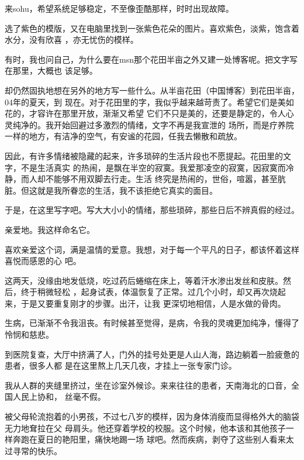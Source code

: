 \documentclass[12pt,a4paper]{article}
\begin{document}
	\endwriting



		来sohu，希望系统足够稳定，不至像歪酷那样，时时出现故障。

		选了紫色的模版，又在电脑里找到一张紫色花朵的图片。喜欢紫色，淡紫，饱含着水分，没有欣喜
	，亦无忧伤的模样。

		有时，我也问自己，为什么要在msn那个花田半亩之外又建一处博客呢。把文字写在那里，大概也
	该足够。

		却仍然固执地想在另外的地方写一些什么。从半亩花田（中国博客）到花田半亩，04年的夏天，到
	现在。对于花田里的字，我似乎越来越苛责了。希望它们是美如花的，才容许在那里开放，渐渐又希望
	它们不只是美的，还要是静定的，令人心灵纯净的。我开始回避过多激烈的情绪，文字不再是我宣泄的
	场所，而是疗养院一样的地方，有洁净的空气，有安谧的花园，任我去懒散和疏放。

		因此，有许多情绪被隐藏的起来，许多琐碎的生活片段也不愿提起。花田里的文字，不是生活真实
	的热闹，是飘在半空的寂寞。我爱那凌空的寂寞，因寂寞而冷静，而人却不能够不用双脚去行走。生活
	终究是热闹的，世俗，喧嚣，甚至肮脏。但这就是我所眷恋的生活，我不该拒绝它真实的面目。

		于是，在这里写字吧。写大大小小的情绪，那些琐碎，那些日后不辨真假的经过。

		亲爱地。我这样命名它。

		喜欢亲爱这个词，满是温情的爱意。我想，对于每一个平凡的日子，都该怀着这样喜悦而感恩的心
	吧。

		这两天，没缘由地发低烧，吃过药后蜷缩在床上，等着汗水渗出发丝和皮肤。然后，终于稍微轻松
	，起身试表，体温恢复了正常。过几个小时，却又再次烧起来，于是又要重复刚才的步骤。出汗，让我
	更深切地相信，人是水做的骨肉。

		生病，已渐渐不令我沮丧。有时候甚至觉得，是病，令我的灵魂更加纯净，懂得了怜悯和慈悲。

	\endwriting



		到医院复查，大厅中挤满了人，门外的挂号处更是人山人海，路边躺着一脸疲惫的患者，很多人都
	是在这里熬上几天几夜，才挂上一张专家门诊。

		我从人群的夹缝里挤过，坐在诊室外候诊。来来往往的患者，天南海北的口音，全国人民上协和，
	丝毫不假。

		被父母轮流抱着的小男孩，不过七八岁的模样，因为身体消瘦而显得格外大的脑袋无力地耷拉在父
	母肩头。他还穿着学校的校服。这个时候，他本该和其他孩子一样奔跑在夏日的艳阳里，痛快地踢一场
	球吧。然而疾病，剥夺了这些别人看来太过寻常的快乐。
\end{document}
